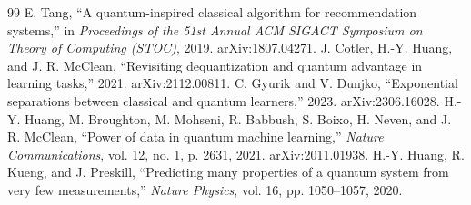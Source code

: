 \documentclass[11pt]{article}
\begin{document}
\begin{thebibliography}{99}
 E. Tang, ``A quantum-inspired classical algorithm for recommendation systems,'' in \textit{Proceedings of the 51st Annual ACM SIGACT Symposium on Theory of Computing (STOC)}, 2019. arXiv:1807.04271.
 J. Cotler, H.-Y. Huang, and J. R. McClean, ``Revisiting dequantization and quantum advantage in learning tasks,'' 2021. arXiv:2112.00811.
 C. Gyurik and V. Dunjko, ``Exponential separations between classical and quantum learners,'' 2023. arXiv:2306.16028.
 H.-Y. Huang, M. Broughton, M. Mohseni, R. Babbush, S. Boixo, H. Neven, and J. R. McClean, ``Power of data in quantum machine learning,'' \textit{Nature Communications}, vol. 12, no. 1, p. 2631, 2021. arXiv:2011.01938.
 H.-Y. Huang, R. Kueng, and J. Preskill, ``Predicting many properties of a quantum system from very few measurements,'' \textit{Nature Physics}, vol. 16, pp. 1050--1057, 2020.

\end{thebibliography}
\end{document}

